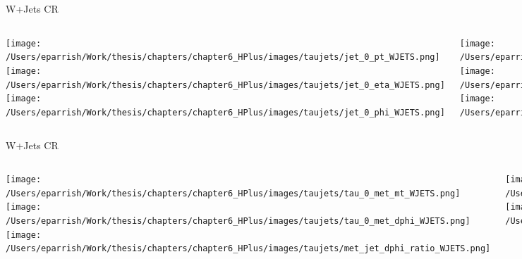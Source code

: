\documentclass[aspectratio=169,xcolor=table]{beamer}
\begin{document}
    \begin{frame}[t]{W+Jets CR}
      \begin{columns}[t]
          \texttt{[image: /Users/eparrish/Work/thesis/chapters/chapter6\_HPlus/images/taujets/jet\_0\_pt\_WJETS.png]}
          \texttt{[image: /Users/eparrish/Work/thesis/chapters/chapter6\_HPlus/images/taujets/jet\_0\_eta\_WJETS.png]}
          \texttt{[image: /Users/eparrish/Work/thesis/chapters/chapter6\_HPlus/images/taujets/jet\_0\_phi\_WJETS.png]}

          \texttt{[image: /Users/eparrish/Work/thesis/chapters/chapter6\_HPlus/images/taujets/jet\_1\_pt\_WJETS.png]}
          \texttt{[image: /Users/eparrish/Work/thesis/chapters/chapter6\_HPlus/images/taujets/jet\_1\_eta\_WJETS.png]}
          \texttt{[image: /Users/eparrish/Work/thesis/chapters/chapter6\_HPlus/images/taujets/jet\_1\_phi\_WJETS.png]}

          \texttt{[image: /Users/eparrish/Work/thesis/chapters/chapter6\_HPlus/images/taujets/jet\_2\_pt\_WJETS.png]}
          \texttt{[image: /Users/eparrish/Work/thesis/chapters/chapter6\_HPlus/images/taujets/jet\_2\_eta\_WJETS.png]}
          \texttt{[image: /Users/eparrish/Work/thesis/chapters/chapter6\_HPlus/images/taujets/jet\_2\_phi\_WJETS.png]}

          \texttt{[image: /Users/eparrish/Work/thesis/chapters/chapter6\_HPlus/images/taujets/effm\_tau\_WJETS.png]}

      \end{columns}
    \end{frame}

    \begin{frame}[t]{W+Jets CR}
      \begin{columns}[t]
          \texttt{[image: /Users/eparrish/Work/thesis/chapters/chapter6\_HPlus/images/taujets/tau\_0\_met\_mt\_WJETS.png]}
          \texttt{[image: /Users/eparrish/Work/thesis/chapters/chapter6\_HPlus/images/taujets/tau\_0\_met\_dphi\_WJETS.png]}
          \texttt{[image: /Users/eparrish/Work/thesis/chapters/chapter6\_HPlus/images/taujets/met\_jet\_dphi\_ratio\_WJETS.png]}

          \texttt{[image: /Users/eparrish/Work/thesis/chapters/chapter6\_HPlus/images/taujets/bjet\_0\_met\_dphi\_WJETS.png]}
          \texttt{[image: /Users/eparrish/Work/thesis/chapters/chapter6\_HPlus/images/taujets/bjet\_0\_tau\_0\_dr\_WJETS.png]}



      \end{columns}
    \end{frame}
\end{document}
